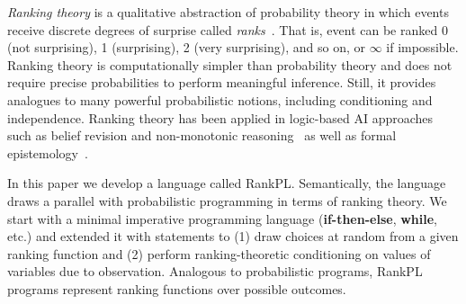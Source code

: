 \documentclass{llncs}
\begin{document}
\emph{Ranking theory} is a qualitative abstraction of probability theory in which events receive discrete degrees of surprise called \emph{ranks}~\cite{DBLP:books/daglib/0035277}.
That is, event can be ranked 0 (not surprising), 1 (surprising), 2 (very surprising), and so on, or $\infty$ if impossible.
Ranking theory is computationally simpler than probability theory and does not require precise probabilities to perform meaningful inference. 
Still, it provides analogues to many powerful probabilistic notions, including conditioning and independence.
Ranking theory has been applied in logic-based AI approaches 
		such as belief revision and non-monotonic reasoning~\cite{DBLP:dblp_journals/ai/DarwicheP97,goldszmidt1996qualitative} 
		as well as formal epistemology~\cite{DBLP:books/daglib/0035277}.

In this paper we develop a language called RankPL.
Semantically, the language draws a parallel with probabilistic programming in terms of ranking theory.
We start with a minimal imperative programming language (\textbf{if-then-else}, \textbf{while}, etc.)
	and extended it with statements to
	(1) draw choices at random from a given ranking function and
	(2) perform ranking-theoretic conditioning on values of variables due to observation.
Analogous to probabilistic programs, RankPL programs represent ranking functions over possible outcomes.
\end{document}
